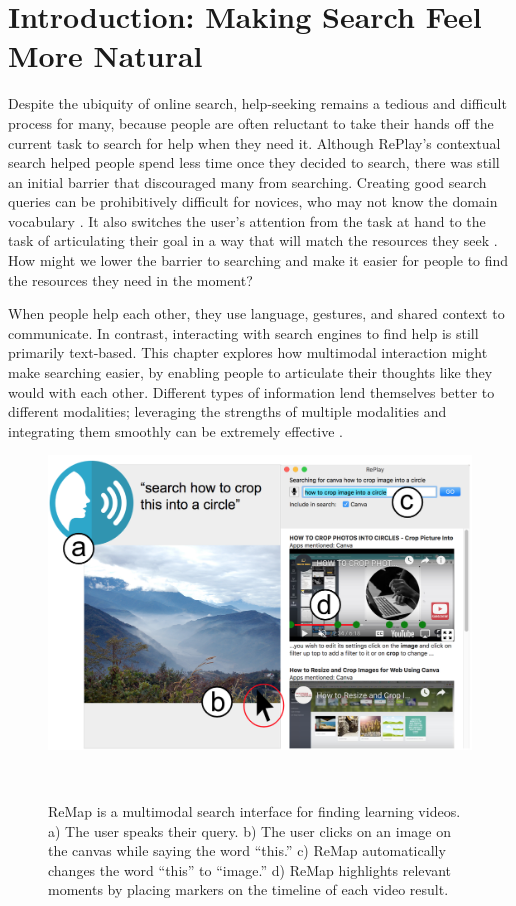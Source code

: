 \section{Introduction: Making Search Feel More Natural}
Despite the ubiquity of online search, help-seeking remains a tedious and difficult process for many, because people are often reluctant to take their hands off the current task to search for help when they need it. Although RePlay's contextual search helped people spend less time once they decided to search, there was still an initial barrier that discouraged many from searching. Creating good search queries can be prohibitively difficult for novices, who may not know the domain vocabulary \cite{Russell2011}. It also switches the user's attention from the task at hand to the task of articulating their goal in a way that will match the resources they seek \cite{Tuovinen1999}. How might we lower the barrier to searching and make it easier for people to find the resources they need in the moment?

When people help each other, they use language, gestures, and shared context to communicate. In contrast, interacting with search engines to find help is still primarily text-based. This chapter explores how multimodal interaction might make searching easier, by enabling people to articulate their thoughts like they would with each other. Different types of information lend themselves better to different modalities; leveraging the strengths of multiple modalities and integrating them smoothly can be extremely effective \cite{Oviatt1999}. 

\begin{figure}[b!]
\centering
  \includegraphics[width=.7\textwidth]{remap/figures/interface.png}
  \caption[ReMap is a multimodal search interface for finding learning videos.]{ReMap is a multimodal search interface for finding learning videos. a) The user speaks their query. b) The user clicks on an image on the canvas while saying the word ``this.'' c) ReMap automatically changes the word ``this'' to ``image.'' d) ReMap highlights relevant moments by placing markers on the timeline of each video result.}~\label{fig:remap_interface}
\end{figure}

